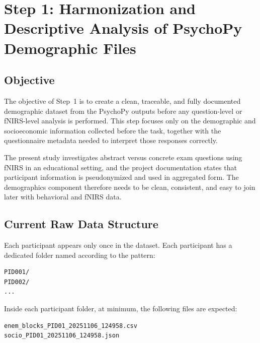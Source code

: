 \section{Step 1: Harmonization and Descriptive Analysis of PsychoPy Demographic Files}
\label{sec:step1_demographics}

\subsection{Objective}
The objective of Step~1 is to create a clean, traceable, and fully documented demographic dataset
from the PsychoPy outputs before any question-level or fNIRS-level analysis is performed.
This step focuses only on the demographic and socioeconomic information collected before the task,
together with the questionnaire metadata needed to interpret those responses correctly.

The present study investigates abstract versus concrete exam questions using fNIRS in an educational
setting, and the project documentation states that participant information is pseudonymized and used
in aggregated form. The demographics component therefore needs to be clean, consistent, and easy
to join later with behavioral and fNIRS data. \cite{step1_project_doc}

\subsection{Current Raw Data Structure}
Each participant appears only once in the dataset.
Each participant has a dedicated folder named according to the pattern:
\begin{verbatim}
PID001/
PID002/
...
\end{verbatim}

Inside each participant folder, at minimum, the following files are expected:
\begin{verbatim}
enem_blocks_PID01_20251106_124958.csv
socio_PID01_20251106_124958.json
\end{verbatim}

